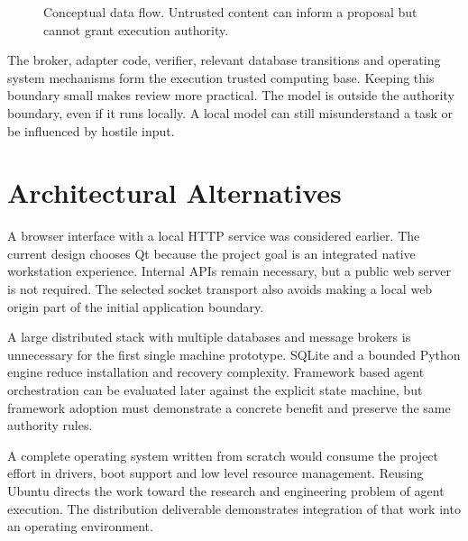 \begin{figure}[htbp]\centering
{}
\caption{Conceptual data flow. Untrusted content can inform a proposal but cannot grant execution authority.}\label{fig:dfd}
\end{figure}

The broker, adapter code, verifier, relevant database transitions and operating system mechanisms form the execution trusted computing base. Keeping this boundary small makes review more practical. The model is outside the authority boundary, even if it runs locally. A local model can still misunderstand a task or be influenced by hostile input.

\section{Architectural Alternatives}
A browser interface with a local HTTP service was considered earlier. The current design chooses Qt because the project goal is an integrated native workstation experience. Internal APIs remain necessary, but a public web server is not required. The selected socket transport also avoids making a local web origin part of the initial application boundary.

A large distributed stack with multiple databases and message brokers is unnecessary for the first single machine prototype. SQLite and a bounded Python engine reduce installation and recovery complexity. Framework based agent orchestration can be evaluated later against the explicit state machine, but framework adoption must demonstrate a concrete benefit and preserve the same authority rules.

A complete operating system written from scratch would consume the project effort in drivers, boot support and low level resource management. Reusing Ubuntu directs the work toward the research and engineering problem of agent execution. The distribution deliverable demonstrates integration of that work into an operating environment.
